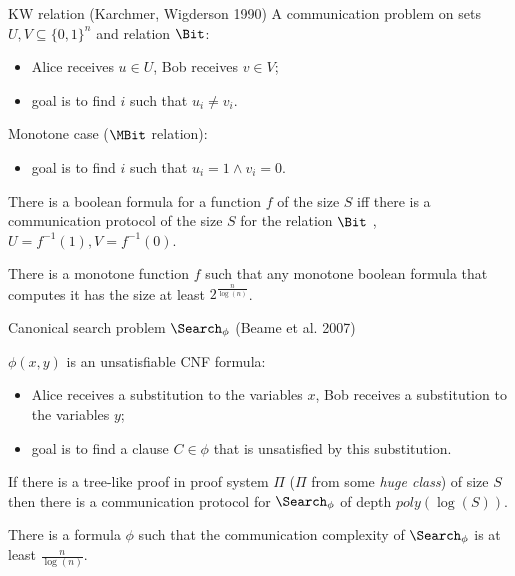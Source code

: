 \begin{frame}{KW relation (Karchmer, Wigderson 1990)}
    A communication problem on sets $U, V \subseteq \{0, 1\}^{n}$ and relation $\Bit$:
    \begin{itemize}
        \item Alice receives $u \in U$, Bob receives $v \in V$;
        \item goal is to find $i$ such that $u_i \neq v_i$.
    \end{itemize}
    \pause
    Monotone case ($\MBit$ relation):
    \begin{itemize}
        \item goal is to find $i$ such that $u_i = 1 \land v_i = 0$.
    \end{itemize}

    \pause

    \begin{theorem}
        There is a  boolean {\color{blue} formula} for a function $f$ of the
        size $S$ iff there is a communication protocol of the size $S$ for the relation $\Bit$
        , $U = f^{-1}(1), V = f^{-1}(0)$.
    \end{theorem}

    \pause
    \pause
    
    \begin{theorem}[Pitassi, G{\"{o}}{\"{o}}s, 2014]
        There is a monotone function $f$ such that any monotone boolean formula that computes it has the
        size at least $2^{\frac{n}{\log(n)}}$. 
    \end{theorem}
\end{frame}

\begin{frame}{Canonical search problem $\Search_{\phi}$ (Beame et al. 2007)}
    
    $\phi(x, y)$ is an unsatisfiable CNF formula:
    \begin{itemize}
        \item Alice receives a substitution to the variables $x$, Bob receives a substitution to the
            variables $y$;
        \item goal is to find a clause $C \in \phi$ that is unsatisfied by this substitution.
    \end{itemize}

    \pause

    \begin{theorem}
        If there is a {\color{blue} tree-like} proof in proof system $\Pi$ ($\Pi$ from some \textit{huge
          class}) of size $S$ then there is a communication protocol for $\Search_{\phi}$ of depth
        $poly(\log(S))$.
    \end{theorem}

    \pause
    
    \begin{theorem}[Pitassi, G{\"{o}}{\"{o}}s, 2014]
        There is a formula $\phi$ such that the communication complexity of $\Search_{\phi}$ is at least
        $\frac{n}{\log(n)}$.
    \end{theorem}
\end{frame}

